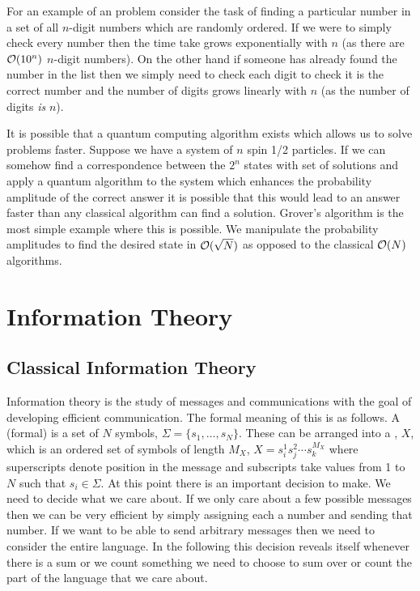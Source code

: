     For an example of an \NPcomplexity problem consider the task of finding a particular number in a set of all \(n\)-digit numbers which are randomly ordered.
    If we were to simply check every number then the time take grows exponentially with \(n\) (as there are \(\mathcal{O}(10^n)\) \(n\)-digit numbers).
    On the other hand if someone has already found the number in the list then we simply need to check each digit to check it is the correct number and the number of digits grows linearly with \(n\) (as the number of digits \emph{is} \(n\)).
    
    It is possible that a quantum computing algorithm exists which allows us to solve \NPcomplexity problems faster.
    Suppose we have a system of \(n\) spin 1/2 particles.
    If we can somehow find a correspondence between the \(2^n\) states with set of solutions and apply a quantum algorithm to the system which enhances the probability amplitude of the correct answer it is possible that this would lead to an answer faster than any classical algorithm can find a solution.
    Grover's algorithm is the most simple example where this is possible.
    We manipulate the probability amplitudes to find the desired state in \(\mathcal{O}(\sqrt{N})\) as opposed to the classical \(\mathcal{O}(N)\) algorithms.
    
    \section{Information Theory}
    \subsection{Classical Information Theory}
    Information theory is the study of messages and communications with the goal of developing efficient communication.
    The formal meaning of this is as follows.
    A (formal)  is a set of \(N\) symbols, \(\Sigma = \{s_1, \dotsc, s_N\}\).
    These can be arranged into a , \(X\), which is an ordered set of symbols of length \(M_X\), \(X = s_{i}^{1}s_{j}^{2}\dotsm s_{k}^{M_X}\) where superscripts denote position in the message and subscripts take values from 1 to \(N\) such that \(s_i\in\Sigma\).
    At this point there is an important decision to make.
    We need to decide what we care about.
    If we only care about a few possible messages then we can be very efficient by simply assigning each a number and sending that number.
    If we want to be able to send arbitrary messages then  we need to consider the entire language.
    In the following this decision reveals itself whenever there is a sum or we count something we need to choose to sum over or count the part of the language that we care about.
    
